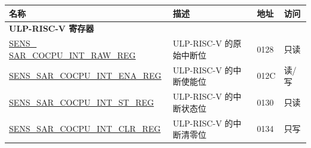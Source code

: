 \begin{longtable}{ | p{6cm} | p{7.2cm} | p{1.3cm} | p{1cm} | }
\hline\rowcolor{lightgray}
名称 & 描述 & 地址 & 访问 \\ \hline
\endhead
\multicolumn{4}{|l|}{\textbf{ULP-RISC-V 寄存器}} \\ \hline
\hyperref[regdesc:SENS SARCOCPUINTRAWREG]{SENS\_ SAR\_COCPU\_INT\_RAW\_REG} & ULP-RISC-V 的原始中断位 & \hexprefix{}0128 & 只读 \\ \hline
\hyperref[regdesc:SENSSARCOCPUINTENAREG]{SENS\_SAR\_COCPU\_INT\_ENA\_REG} & ULP-RISC-V 的中断使能位 & \hexprefix{}012C & 读/写 \\ \hline
\hyperref[regdesc:SENSSARCOCPUINTSTREG]{SENS\_SAR\_COCPU\_INT\_ST\_REG} & ULP-RISC-V 的中断状态位 & \hexprefix{}0130 & 只读 \\ \hline
\hyperref[regdesc:SENSSARCOCPUINTCLRREG]{SENS\_SAR\_COCPU\_INT\_CLR\_REG} & ULP-RISC-V 的中断清零位 & \hexprefix{}0134 & 只写 \\ \hline
\end{longtable}


